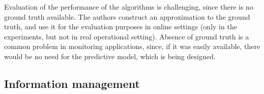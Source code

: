 \documentclass{llncs}
\begin{document}
Evaluation of the performance of the algorithms is challenging, since there is no ground truth available. The authors construct an approximation to the ground truth, and use it for the evaluation purposes in online settings (only in the experiments, but not in real operational setting). Absence of ground truth is a common problem in monitoring applications, since, if it was easily available, there would be no need for the predictive model, which is being designed.


\subsection{Information management}
\end{document}
